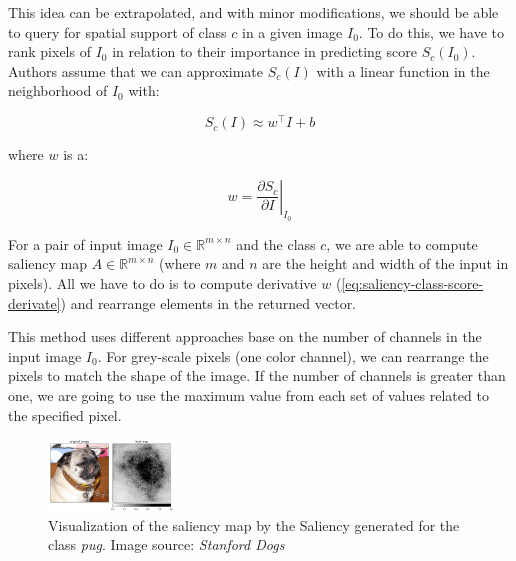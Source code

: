 \vspace{\baselineskip}

This idea can be extrapolated, and with minor modifications, we should be able to query for spatial support of class $c$ in a given image $I_0$. To do this, we have to rank pixels of $I_0$ in relation to their importance in predicting score $S_c(I_0)$. Authors assume that we can approximate $S_c(I)$ with a linear function in the neighborhood of $I_0$ with:

\begin{equation}
S_{c}(I) \approx w^\intercal I + b
\label{eq:saliency-class-score-approximation}
\end{equation}

where $w$ is a:

\begin{equation}
w=\left.\frac{\partial S_{c}}{\partial I}\right|_{I_{0}}
\label{eq:saliency-class-score-derivate}
\end{equation}

For a pair of input image $I_0 \in \mathbb{R}^{m \times n}$ and the class $c$, we are able to compute saliency map $A \in \mathbb{R}^{m \times n}$ (where $m$ and $n$ are the height and width of the input in pixels). All we have to do is to compute derivative $w$ (\ref{eq:saliency-class-score-derivate}) and rearrange elements in the returned vector.

\vspace{\baselineskip}

This method uses different approaches base on the number of channels in the input image $I_0$. For grey-scale pixels (one color channel), we can rearrange the pixels to match the shape of the image. If the number of channels is greater than one, we are going to use the maximum value from each set of values related to the specified pixel.


\begin{figure}
  \includegraphics[width=0.30\textwidth]{methods/images/pug-saliency.png}
  \caption{Visualization of the saliency map by the Saliency generated for the class \textit{pug}. Image source: \textit{Stanford Dogs} \cite{stanford-dogs}}\label{fig:saliency-map-pug}
\end{figure}

